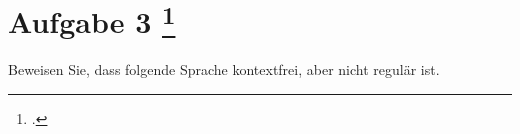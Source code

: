 \documentclass{lehramt-informatik-aufgabe}
\begin{document}
\liAufgabenTitel{}
\section{Aufgabe 3
\footcite{66115:2012:03}}

Beweisen Sie, dass folgende Sprache kontextfrei, aber nicht regulär ist.

\end{document}
